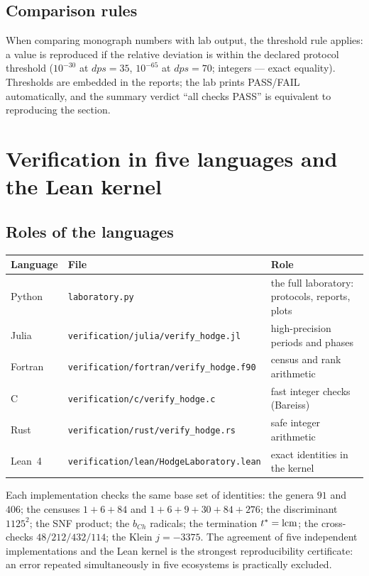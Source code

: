 \subsection{Comparison rules}

When comparing monograph numbers with lab output, the threshold rule
applies: a value is reproduced if the relative deviation is within
the declared protocol threshold ($10^{-30}$ at $dps=35$,
$10^{-65}$ at $dps=70$; integers --- exact equality). Thresholds are
embedded in the reports; the lab prints PASS/FAIL automatically, and
the summary verdict ``all checks PASS'' is equivalent to reproducing
the section.

\section{Verification in five languages and the Lean kernel}
\label{sec:multilang}

\subsection{Roles of the languages}

\begin{center}
\small
\begin{tabularx}{\textwidth}{@{}l l >{\raggedright\arraybackslash}X@{}}
\toprule
Language & File & Role \\
\midrule
Python & \texttt{laboratory.py} & the full laboratory: protocols,
reports, plots \\
Julia & \texttt{verification/julia/verify\_hodge.jl} &
high-precision periods and phases \\
Fortran & \texttt{verification/fortran/verify\_hodge.f90} &
census and rank arithmetic \\
C & \texttt{verification/c/verify\_hodge.c} & fast integer checks
(Bareiss) \\
Rust & \texttt{verification/rust/verify\_hodge.rs} & safe integer
arithmetic \\
Lean~4 & \texttt{verification/lean/HodgeLaboratory.lean} & exact
identities in the kernel \\
\bottomrule
\end{tabularx}
\end{center}

Each implementation checks the same base set of identities: the
genera $91$ and $406$; the censuses $1+6+84$ and
$1+6+9+30+84+276$; the discriminant $1125^2$; the SNF product; the
$b_{Ch}$ radicals; the termination $t^*=\operatorname{lcm}$; the cross-checks
$48/212/432/114$; the Klein $j=-3375$. The agreement of five
independent implementations and the Lean kernel is the strongest
reproducibility certificate: an error repeated simultaneously in
five ecosystems is practically excluded.


